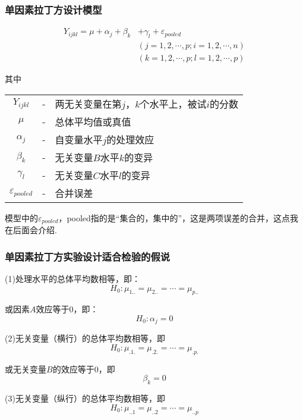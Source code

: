 \subsubsection{单因素拉丁方设计模型}
\begin{definition}[单因素拉丁方设计模型]
\begin{align*}
    Y_{ijkl} = \mu + \alpha _j + \beta _k & + \gamma _l + \varepsilon _{pooled}\\
                                          &(j=1,2,\cdots,p;i=1,2,\cdots,n)\\
                                          &(k=1,2,\cdots,p;l=1,2,\cdots,p)
\end{align*}

其中

{
    \renewcommand\arraystretch{1.25}
    \begin{tabular}{ccl}
        $Y_{ijkl}$     & - &    两无关变量在第$j，k$个水平上，被试$i$的分数\\ 
        $\mu$          & - &    总体平均值或真值\\
        $\alpha _j$    & - &    自变量水平$j$的处理效应\\
        $\beta _k$     & - &    无关变量$B$水平$k$的变异\\
        $\gamma _l$    & - &    无关变量$C$水平$l$的变异\\
        $\varepsilon _{pooled}$ &-& 合并误差
    \end{tabular}
}

\end{definition}

模型中的$\varepsilon _{pooled}$，pooled指的是“集合的，集中的”，这是两项误差的合并，这点我在后面会介绍.

\subsubsection{单因素拉丁方实验设计适合检验的假说}
(1)处理水平的总体平均数相等，即：
\[ H_0 : \mu _{1..} = \mu _{2..} = \cdots = \mu _{p..}\]

或因素$A$效应等于0，即：
\[ H_0 : \alpha _j = 0 \]

(2)无关变量（横行）的总体平均数相等，即
\[ H_0 : \mu _{.1.} = \mu _{.2.} = \cdots = \mu _{.p.} \]

或无关变量$B$的效应等于0，即
\[ \beta _k = 0 \]

(3)无关变量（纵行）的总体平均数相等，即
\[ H_0 : \mu _{..1} = \mu _{..2} = \cdots = \mu _{..p} \]

